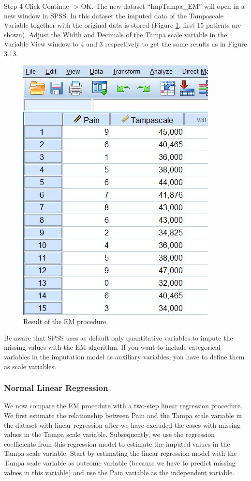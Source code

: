 \documentclass[]{book}
\begin{document}
Step 4 Click Continue -\textgreater{} OK. The new dataset
``ImpTampa\_EM'' will open in a new window in SPSS. In this dataset the
imputed data of the Tampascale Variable together with the original data
is stored (Figure \ref{fig:fig3-13}, first 15 patients are shown).
Adjust the Width and Decimals of the Tampa scale variable in the
Variable View window to 4 and 3 respectively to get the same results as
in Figure 3.13.

\begin{figure}

{\centering \includegraphics[width=0.7\linewidth]{images/fig3.13} 

}

\caption{Result of the EM procedure.}\label{fig:fig3-13}
\end{figure}

Be aware that SPSS uses as default only quantitative variables to impute
the missing values with the EM algorithm. If you want to include
categorical variables in the imputation model as auxiliary variables,
you have to define them as scale variables.

\subsubsection{Normal Linear Regression}\label{normal-linear-regression}

We now compare the EM procedure with a two-step linear regression
procedure. We first estimate the relationship between Pain and the Tampa
scale variable in the dataset with linear regression after we have
excluded the cases with missing values in the Tampa scale variable.
Subsequently, we use the regression coefficients from this regression
model to estimate the imputed values in the Tampa scale variable. Start
by estimating the linear regression model with the Tampa scale variable
as outcome variable (because we have to predict missing values in this
variable) and use the Pain variable as the independent variable.
\end{document}
